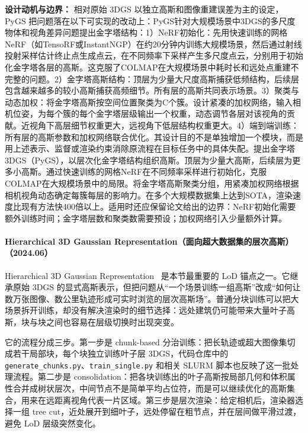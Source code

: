 \textbf{设计动机与边界：} 相对原始 3DGS 以独立高斯和图像重建误差为主的设定，PyGS 把问题落在以下可实现的改动上：PyGS针对大规模场景中3DGS的多尺度物体和视角差异问题提出金字塔结构：1）NeRF初始化：先用快速训练的网格NeRF（如TensoRF或InstantNGP）在约20分钟内训练大规模场景，然后通过射线投射采样估计终止点生成点云，在不同频率下采样产生多尺度点云，分别用于初始化金字塔各层的高斯。这克服了COLMAP在大规模场景中耗时长和远处点重建不完整的问题。2）金字塔高斯结构：顶层为少量大尺度高斯捕获低频结构，后续层包含越来越多的较小高斯捕获高频细节。所有层的高斯共同表示场景。3）聚类与动态加权：将金字塔高斯按空间位置聚类为C个簇。设计紧凑的加权网络，输入相机位姿，为每个簇的每个金字塔层级输出一个权重，动态调节各层对该视角的贡献。近视角下高层细节权重更大，远视角下低层结构权重更大。4）端到端训练：所有层的高斯参数和加权网络联合优化。其设计目的不是单独增加一个模块，而是用上述表示、监督或渲染约束消除原流程在目标任务中的具体失配。提出金字塔3DGS（PyGS），以层次化金字塔结构组织高斯。顶层为少量大高斯，后续层为更多小高斯。通过快速训练的网格NeRF在不同频率采样进行初始化，克服COLMAP在大规模场景中的局限。将金字塔高斯聚类分组，用紧凑加权网络根据相机视角动态确定每簇每层的影响力。在多个大规模数据集上达到SOTA，渲染速度比现有方法快400倍以上。适用时还应保留论文给出的边界：NeRF初始化需要额外训练时间；金字塔层数和聚类数需要预设；加权网络引入少量额外计算。
\paragraph{Hierarchical 3D Gaussian Representation（面向超大数据集的层次高斯）（2024.06）}
Hierarchical 3D Gaussian Representation~\cite{2406_12080} 是本节最重要的 LoD 锚点之一。它继承原始 3DGS 的显式高斯表示，但把问题从“一个场景训练一组高斯”改成“如何让数万张图像、数公里轨迹形成可实时浏览的层次高斯场”。普通分块训练可以把大场景拆开训练，却没有解决渲染时的细节选择：远处建筑仍可能带来大量叶子高斯，块与块之间也容易在层级切换时出现突变。

它的流程分成三步。第一步是 chunk-based 分治训练：把长轨迹或超大图像集切成若干局部块，每个块独立训练叶子层 3DGS，代码仓库中的 \texttt{generate\_chunks.py}、\texttt{train\_single.py} 和相关 SLURM 脚本也反映了这一批处理流程。第二步是 consolidation：把各块训练出的叶子高斯按局部几何和体积属性合并成树状层次，中间节点不是简单平均占位符，而是可以继续优化的高斯集合，用来在远距离视角代表一片区域。第三步是层次渲染：给定相机后，渲染器选择一组 tree cut，近处展开到细叶子，远处停留在粗节点，并在层间做平滑过渡，避免 LoD 层级突然变化。

